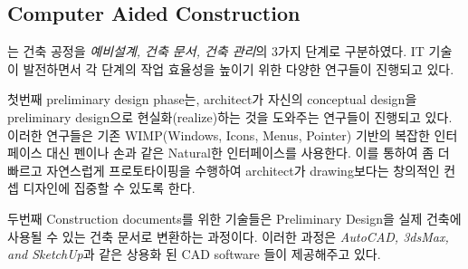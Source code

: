 

\subsection{Computer Aided Construction}

\cite{harrison_architects_design_????}는 건축 공정을 \textit{예비설계, 건축 문서, 건축 관리}의 3가지 단계로 구분하였다. IT 기술이 발전하면서 각 단계의 작업 효율성을 높이기 위한 다양한 연구들이 진행되고 있다.

첫번째 preliminary design phase는, architect가 자신의 conceptual design을 preliminary design으로 현실화(realize)하는 것을 도와주는 연구들이 진행되고 있다\cite{bae_ilovesketch:_2008, igarashi_teddy:_2007, song_modelcraft_2009, yu_prototype_2007, zeleznik_sketch:_2007}. 이러한 연구들은 기존 WIMP(Windows, Icons, Menus, Pointer)\cite{wikipedia_contributors_wimp_2014} 기반의 복잡한 인터페이스 대신 펜이나 손과 같은 Natural한 인터페이스를 사용한다. 이를 통하여 좀 더 빠르고 자연스럽게 프로토타이핑을 수행하여 architect가 drawing보다는 창의적인 컨셉 디자인에 집중할 수 있도록 한다. 

두번째 Construction documents를 위한 기술들은 Preliminary Design을 실제 건축에 사용될 수 있는 건축 문서로 변환하는 과정이다. 이러한 과정은 \textit{AutoCAD, 3dsMax, and SketchUp}과 같은 상용화 된 CAD software 들이 제공해주고 있다\cite{autodesk_3ds_????, autodesk_autocad_????, google_sketchup_????}.

